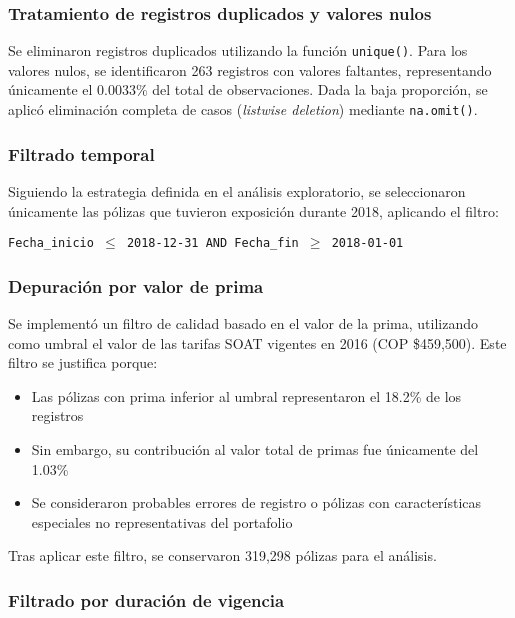 \subsubsection{Tratamiento de registros duplicados y valores nulos}

Se eliminaron registros duplicados utilizando la función \texttt{unique()}. Para los valores nulos, se identificaron 263 registros con valores faltantes, representando únicamente el 0.0033\% del total de observaciones. Dada la baja proporción, se aplicó eliminación completa de casos (\textit{listwise deletion}) mediante \texttt{na.omit()}.

\subsubsection{Filtrado temporal}

Siguiendo la estrategia definida en el análisis exploratorio, se seleccionaron únicamente las pólizas que tuvieron exposición durante 2018, aplicando el filtro:

\begin{center}
\texttt{Fecha\_inicio $\leq$ 2018-12-31 AND Fecha\_fin $\geq$ 2018-01-01}
\end{center}

\subsubsection{Depuración por valor de prima}

Se implementó un filtro de calidad basado en el valor de la prima, utilizando como umbral el valor de las tarifas SOAT vigentes en 2016 (COP \$459,500). Este filtro se justifica porque:

\begin{itemize}
    \item Las pólizas con prima inferior al umbral representaron el 18.2\% de los registros
    \item Sin embargo, su contribución al valor total de primas fue únicamente del 1.03\%
    \item Se consideraron probables errores de registro o pólizas con características especiales no representativas del portafolio
\end{itemize}

Tras aplicar este filtro, se conservaron 319,298 pólizas para el análisis.

\subsubsection{Filtrado por duración de vigencia}

